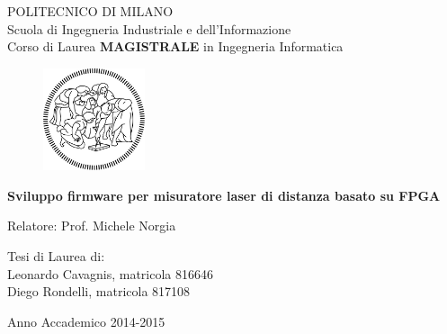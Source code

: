 \thispagestyle{empty}
\vspace*{-1.5cm} \bfseries{
\begin{center}
  \large
  POLITECNICO DI MILANO\\
  \normalsize
  Scuola di Ingegneria Industriale e dell'Informazione\\
  Corso di Laurea \textbf{MAGISTRALE} in Ingegneria Informatica\\
  \begin{figure}[htbp]
    \begin{center}
      \includegraphics[width=3cm]{./pictures/frontesp/NewLogo_lite.png}
    \end{center}
  \end{figure}
  \vspace*{0.3cm} \LARGE



  \textbf{Sviluppo firmware per misuratore laser di distanza basato su FPGA}\\



  \vspace*{.75truecm} \large
\end{center}
\vspace*{3.0cm} \large
\begin{flushleft}


  Relatore: Prof. Michele Norgia

\end{flushleft}
\vspace*{1.0cm}
\begin{flushright}


  Tesi di Laurea di:\\ Leonardo Cavagnis, matricola 816646 \\ 
		       Diego Rondelli, matricola 817108 \\


\end{flushright}
\vspace*{0.5cm}
\begin{center}



  Anno Accademico 2014-2015
\end{center} \clearpage
}
